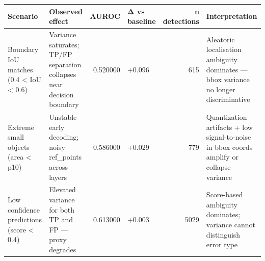 \begin{tabular}{llrlrl}
\toprule
Scenario & Observed effect & AUROC & Δ vs baseline & n detections & Interpretation \\
\midrule
Boundary IoU matches (0.4 < IoU < 0.6) & Variance saturates; TP/FP separation collapses near decision boundary & 0.520000 & +0.096 & 615 & Aleatoric localisation ambiguity dominates — bbox variance no longer discriminative \\
Extreme small objects (area < p10) & Unstable early decoding; noisy ref\_points across layers & 0.586000 & +0.029 & 779 & Quantization artifacts + low signal-to-noise in bbox coords amplify or collapse variance \\
Low confidence predictions (score < 0.4) & Elevated variance for both TP and FP — proxy degrades & 0.613000 & +0.003 & 5029 & Score-based ambiguity dominates; variance cannot distinguish error type \\
\bottomrule
\end{tabular}
